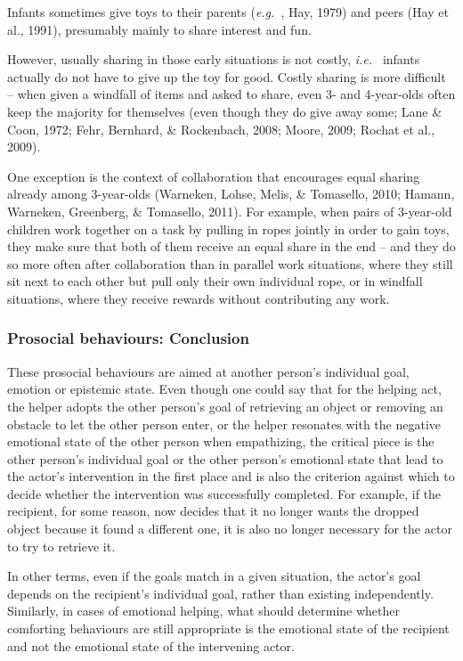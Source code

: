 \documentclass{article}
\newcommand{\ie}{{\textit{i.e.~}}}
\newcommand{\eg}{{\textit{e.g.~}}}
\begin{document}
Infants sometimes give toys to their parents (\eg, Hay, 1979) and peers
(Hay et al., 1991), presumably mainly to share interest and fun. 

However, usually sharing in those early situations is not costly, \ie
infants actually do not have to give up the toy for good. Costly sharing is
more difficult -- when given a windfall of items and asked to share, even 3- and
4-year-olds often keep the majority for themselves (even though they do give
away some; Lane \& Coon, 1972; Fehr, Bernhard, \& Rockenbach, 2008; Moore,
2009; Rochat et al., 2009). 

One exception is the context of collaboration that encourages equal
sharing already among 3-year-olds (Warneken, Lohse, Melis, \& Tomasello, 2010;
Hamann, Warneken, Greenberg, \& Tomasello, 2011). For example, when pairs of
3-year-old children work together on a task by pulling in ropes jointly in
order to gain toys, they make sure that both of them receive an equal share in
the end -- and they do so more often after collaboration than in parallel work
situations, where they still sit next to each other but pull only their own
individual rope, or in windfall situations, where they receive rewards without
contributing any work. 

\subsubsection{Prosocial behaviours: Conclusion}

These prosocial behaviours are aimed at another person's individual goal,
emotion or epistemic state. Even though one could say that for the helping act,
the helper adopts the other person's goal of retrieving an object or removing
an obstacle to let the other person enter, or the helper resonates with the
negative emotional state of the other person when empathizing, the critical
piece is the other person's individual goal or the other person's emotional
state that lead to the actor's intervention in the first place and is also
the criterion against which to decide whether the intervention was successfully
completed. For example, if the recipient, for some reason, now decides that it no
longer wants the dropped object because it found a different one, it is also no
longer necessary for the actor to try to retrieve it.

In other terms, even if
the goals match in a given situation, the actor's goal depends on the
recipient's individual goal, rather than existing independently. Similarly,
in cases of emotional helping, what should determine whether comforting
behaviours are still appropriate is the emotional state of the recipient and not
the emotional state of the intervening actor.
\end{document}
